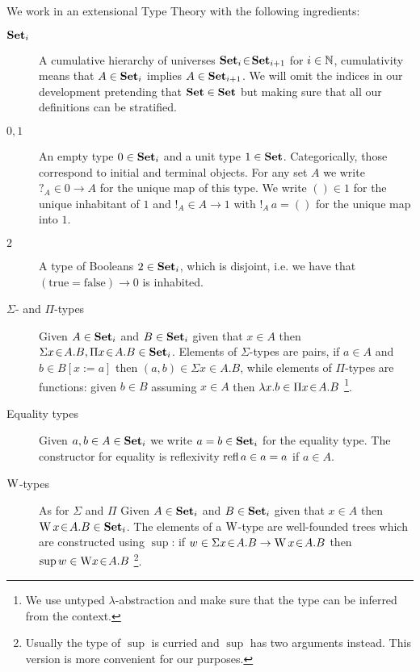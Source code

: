 \documentclass[10pt, conference, compsocconf]{IEEEtran}
\begin{document}
\noindent We work in an extensional
Type Theory \cite{martinlof:itt} 
with the following ingredients:
\begin{description}
\item[$\mathbf{Set}_i$] A cumulative hierarchy of universes $\mathbf{Set}_i\!\in\!\mathbf{Set}_{i+1}$ for
  $i\in\mathbb{N}$, cumulativity means that $A\in\mathbf{Set}_i$ implies
  $A\in\mathbf{Set}_{i+1}$. We will omit the indices in our development 
  pretending that $\mathbf{Set}\in\mathbf{Set}$ but making sure that all our definitions
  can be stratified.

\item[$0,1$] An empty type $0\in\mathbf{Set}_i$ and a unit type
  $1\in\mathbf{Set}$. Categorically, those correspond to initial and
  terminal objects. For any set $A$ we write $?_A \in 0 \to A$ for the
  unique map of this type. We write $() \in 1$ for the unique
  inhabitant of $1$ and $!_A \in A \to 1$ with $!_A\,a = ()$ for the
  unique map into $1$. 

\item[$2$] A type of Booleans $2\in\mathbf{Set}_i$, which is disjoint, i.e. we
  have that $(\mathrm{true} = \mathrm{false})\to 0$ is inhabited. 

\item[$\Sigma$- and $\Pi$-types] 

\item[]  Given $A\in\mathbf{Set}_i$ and $B\in\mathbf{Set}_i$
  given that $x\in A$ then $\Sigma x\!\in\! A.B, \Pi x\!\in\! A.B \in \mathbf{Set}_i$.
  Elements of $\Sigma$-types are pairs, if $a\in A$ and $b\in B[x:=a]$
  then $(a,b) \in \Sigma x\in A.B$, while elements of $\Pi$-types are
  functions: given $b\in B$ assuming $x\in A$ then $\lambda x.b \in
  \Pi x\!\in\! A.B$%
  \footnote{We use untyped $\lambda$-abstraction and make sure that
    the type can be inferred from the context.}.

\item[Equality types] 

\item[]  Given $a,b\in A \in \mathbf{Set}_i$ we write $a = b \in
  \mathbf{Set}_i$ for the equality type. The constructor for equality is
  reflexivity $\mathrm{refl}\,a \in a=a$ if $a\in A$. 

\item[$\mathrm{W}$-types] 

\item[]  As for $\Sigma$ and $\Pi$ Given $A\in\mathbf{Set}_i$ and
  $B\in\mathbf{Set}_i$ given that $x\in A$ then $\mathrm{W}\,x\!\in\! A.B \in \mathbf{Set}_i$.
  The elements of a $\mathrm{W}$-type are well-founded trees which are
  constructed using $\sup$: if $w\in\Sigma x\!\in\! A.B\to \mathrm{W}\,x\!\in\! A.B$ 
  then $\mathrm{sup}\,w \in \mathrm{W} x\!\in\! A.B$
\footnote{Usually the type of $\sup$ is curried and $\sup$ has two
  arguments instead. This version is more convenient for our purposes.}.
\end{description}
\end{document}
